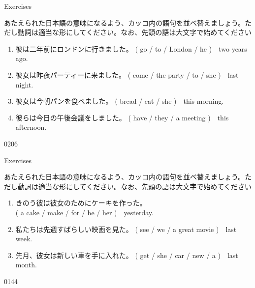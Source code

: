 \documentclass[aspectratio=169,xcolor={dvipsnames,table}]{beamer}
\newcommand{\myaudio}[1]{\href{#1}{\faVolumeUp}}
\begin{document}
\begin{frame}[plain]{Exercises}

{\small あたえられた日本語の意味になるよう、カッコ内の語句を並べ替えましょう。ただし動詞は適当な形にしてください。なお、先頭の語は大文字で始めてください}


\begin{enumerate}
 \item {\small 彼は二年前にロンドンに行きました。}
(  go / to / London / he )~~two years ago.\\
 \item {\small 彼女は昨夜パーティーに来ました。}\hspace{1\zw}
( come / the  party / to / she )~~last night.\\
 \item {\small 彼女は今朝パンを食べました。}\hspace{2.65\zw}
( bread / eat /  she  )~~this morning.\\
 \item {\small 彼らは今日の午後会議をしました。}\hspace{.75\zw}
( have / they / a meeting )~~this afternoon.\\
\end{enumerate}
\hfill{\tiny 0206}\,{\scriptsize \myaudio{./audio/025_past_do_15.mp3}}

\end{frame}
\begin{frame}[plain]{Exercises}

{\small あたえられた日本語の意味になるよう、カッコ内の語句を並べ替えましょう。ただし動詞は適当な形にしてください。なお、先頭の語は大文字で始めてください}

\begin{enumerate}
 \item きのう彼は彼女のためにケーキを作った。\\
\mbox{}\hfill{}( a cake / make / for / he / her )~~yesterday.\\
 \item 私たちは先週すばらしい映画を見た。
\hfill{}( see / we / a great movie )~~last week.\\
 \item 先月、彼女は新しい車を手に入れた。
( get / she / car  / new / a )~~last month.\\

\end{enumerate}
\hfill{\tiny 0144}\,{\scriptsize \myaudio{./audio/025_past_do_16.mp3}}

\end{frame}
\end{document}
